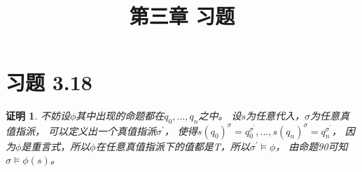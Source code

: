\documentclass{article}
\theoremstyle{mystyle}
\theoremstyle{zproofstyle}
\newtheorem*{zproof}{证明}
\begin{document}
\title{第三章 习题}
\maketitle

\section*{习题 3.18}
\begin{zproof}
    不妨设$\phi$其中出现的命题都在$q_0,...,q_n$之中。
    设$s$为任意代入，$\sigma$为任意真值指派，
    可以定义出一个真值指派$\sigma^\prime$，
    使得$s(q_0)^\sigma = q_0^{\sigma^\prime},...,s(q_n)^\sigma = q_n^{\sigma^\prime}$，
    因为$\phi$是重言式，所以$\phi$在任意真值指派下的值都是T，所以${\sigma^\prime} \models \phi$，
    由命题90可知$\sigma \models \phi(s)$。
\end{zproof}
\end{document}
